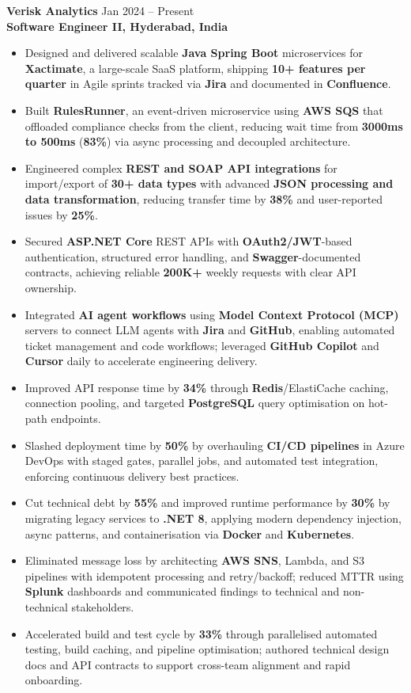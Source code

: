 \documentclass[letterpaper,10pt]{article}
\begin{document}
\textbf{Verisk Analytics} \hfill Jan 2024 -- Present \\
\textbf{Software Engineer II, Hyderabad, India}
\begin{itemize}[leftmargin=*]
    \item Designed and delivered scalable \textbf{Java Spring Boot} microservices for \textbf{Xactimate}, a large-scale SaaS platform, shipping \textbf{10+ features per quarter} in Agile sprints tracked via \textbf{Jira} and documented in \textbf{Confluence}.
    \item Built \textbf{RulesRunner}, an event-driven microservice using \textbf{AWS SQS} that offloaded compliance checks from the client, reducing wait time from \textbf{3000ms to 500ms} (\textbf{83\%}) via async processing and decoupled architecture.
    \item Engineered complex \textbf{REST and SOAP API integrations} for import/export of \textbf{30+ data types} with advanced \textbf{JSON processing and data transformation}, reducing transfer time by \textbf{38\%} and user-reported issues by \textbf{25\%}.
    \item Secured \textbf{ASP.NET Core} REST APIs with \textbf{OAuth2/JWT}-based authentication, structured error handling, and \textbf{Swagger}-documented contracts, achieving reliable \textbf{200K+} weekly requests with clear API ownership.
    \item Integrated \textbf{AI agent workflows} using \textbf{Model Context Protocol (MCP)} servers to connect LLM agents with \textbf{Jira} and \textbf{GitHub}, enabling automated ticket management and code workflows; leveraged \textbf{GitHub Copilot} and \textbf{Cursor} daily to accelerate engineering delivery.
    \item Improved API response time by \textbf{34\%} through \textbf{Redis}/ElastiCache caching, connection pooling, and targeted \textbf{PostgreSQL} query optimisation on hot-path endpoints.
    \item Slashed deployment time by \textbf{50\%} by overhauling \textbf{CI/CD pipelines} in Azure DevOps with staged gates, parallel jobs, and automated test integration, enforcing continuous delivery best practices.
    \item Cut technical debt by \textbf{55\%} and improved runtime performance by \textbf{30\%} by migrating legacy services to \textbf{.NET 8}, applying modern dependency injection, async patterns, and containerisation via \textbf{Docker} and \textbf{Kubernetes}.
    \item Eliminated message loss by architecting \textbf{AWS SNS}, Lambda, and S3 pipelines with idempotent processing and retry/backoff; reduced MTTR using \textbf{Splunk} dashboards and communicated findings to technical and non-technical stakeholders.
    \item Accelerated build and test cycle by \textbf{33\%} through parallelised automated testing, build caching, and pipeline optimisation; authored technical design docs and API contracts to support cross-team alignment and rapid onboarding.
\end{itemize}
\end{document}
